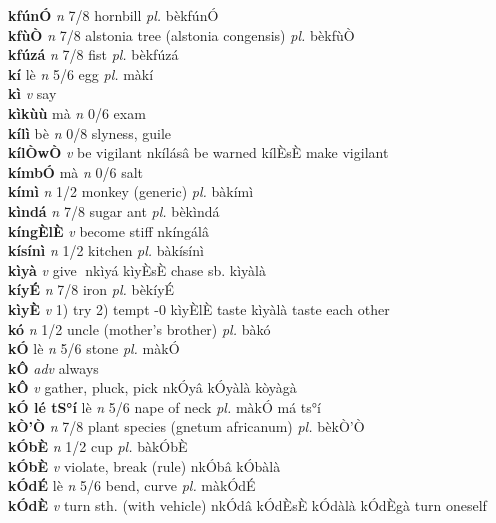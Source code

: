 \documentclass{article}
\begin{document}
{\bf kfúnÓ}  {\it n} 7/8 hornbill {\it pl.} bèkfúnÓ         \\ 
{\bf kfùÒ}  {\it n} 7/8 alstonia tree (alstonia congensis) {\it pl.} bèkfùÒ         \\ 
{\bf kfúzá}  {\it n} 7/8 fist {\it pl.} bèkfúzá         \\ 
{\bf kí} lè {\it n} 5/6 egg {\it pl.} màkí         \\ 
{\bf kì}  {\it v} say         \\ 
{\bf kìkùù} mà {\it n} 0/6 exam         \\ 
{\bf kílì} bè {\it n} 0/8 slyness, guile         \\ 
{\bf kílÒwÒ}  {\it v} be vigilant   nkílásâ be warned  kílÈsÈ make vigilant    \\ 
{\bf kímbÓ} mà {\it n} 0/6 salt         \\ 
{\bf kímì}  {\it n} 1/2 monkey (generic) {\it pl.} bàkímì         \\ 
{\bf kìndá}  {\it n} 7/8 sugar ant {\it pl.} bèkìndá         \\ 
{\bf kíngÈlÈ}  {\it v} become stiff   nkíngálâ      \\ 
{\bf kísínì}  {\it n} 1/2 kitchen {\it pl.} bàkísínì         \\ 
{\bf kìyà}  {\it v} give   nkìyá  kìyÈsÈ chase sb. kìyàlà   \\ 
{\bf kíyÉ}  {\it n} 7/8 iron {\it pl.} bèkíyÉ         \\ 
{\bf kìyÈ}  {\it v} 1) try 2) tempt   -0 kìyÈlÈ taste  kìyàlà taste each other   \\ 
{\bf kó}  {\it n} 1/2 uncle (mother's brother) {\it pl.} bàkó         \\ 
{\bf kÓ} lè {\it n} 5/6 stone {\it pl.} màkÓ         \\ 
{\bf kÔ}  {\it adv} always         \\ 
{\bf kÔ}  {\it v} gather, pluck, pick   nkÓyâ   kÓyàlà kòyàgà  \\ 
{\bf kÓ lé tS°í} lè {\it n} 5/6 nape of neck {\it pl.} màkÓ má ts°í         \\ 
{\bf kÒ'Ò}  {\it n} 7/8 plant species (gnetum africanum) {\it pl.} bèkÒ'Ò         \\ 
{\bf kÓbÈ}  {\it n} 1/2 cup {\it pl.} bàkÓbÈ         \\ 
{\bf kÓbÈ}  {\it v} violate, break (rule)   nkÓbâ   kÓbàlà   \\ 
{\bf kÓdÉ} lè {\it n} 5/6 bend, curve {\it pl.} màkÓdÉ         \\ 
{\bf kÓdÈ}  {\it v} turn sth. (with vehicle)   nkÓdâ  kÓdÈsÈ kÓdàlà kÓdÈgà turn oneself  \\ 
\end{document}
